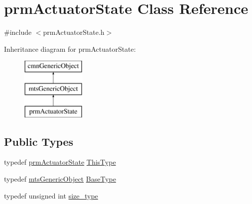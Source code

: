 \hypertarget{classprm_actuator_state}{\section{prm\-Actuator\-State Class Reference}
\label{classprm_actuator_state}
}


{\ttfamily \#include $<$prm\-Actuator\-State.\-h$>$}

Inheritance diagram for prm\-Actuator\-State\-:\begin{figure}[H]
\begin{center}
\leavevmode
\includegraphics[height=3.000000cm]{d2/df6/classprm_actuator_state}
\end{center}
\end{figure}
\subsection*{Public Types}
\begin{DoxyCompactItemize}
\item 
typedef \hyperlink{classprm_actuator_state}{prm\-Actuator\-State} \hyperlink{classprm_actuator_state_ac269257fa02fea72e3a2d55526f9a627}{This\-Type}
\item 
typedef \hyperlink{classmts_generic_object}{mts\-Generic\-Object} \hyperlink{classprm_actuator_state_abdc6ad9216ba3ef6720153feeadee054}{Base\-Type}
\item 
typedef unsigned int \hyperlink{classprm_actuator_state_a1ed9ac69482dab8ddf628b1858c42631}{size\-\_\-type}
\end{DoxyCompactItemize}

